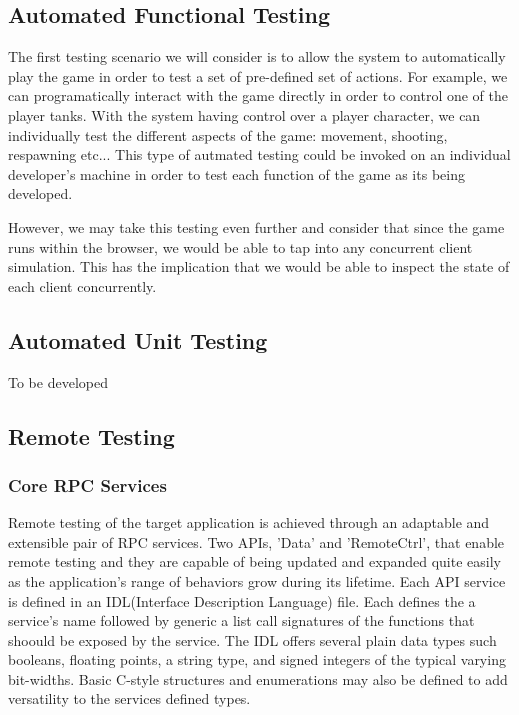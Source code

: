 \documentclass[conference]{IEEEtran}
\begin{document}
\subsection{Automated Functional Testing}

The first testing scenario we will consider is to allow the system to automatically play the game in order to test a set of pre-defined set of actions.
For example, we can programatically interact with the game directly in order to control one of the player tanks. With the system having control over a player character, 
we can individually test the different aspects of the game: movement, shooting, respawning etc... This type of autmated testing could be invoked on an individual developer's 
machine in order to test each function of the game as its being developed. 

However, we may take this testing even further and consider that since the game runs within the browser, we would be able to tap into any concurrent client simulation. This 
has the implication that we would be able to inspect the state of each client concurrently. 

\subsection{Automated Unit Testing}

To be developed 


\subsection{Remote Testing}

\subsubsection{Core RPC Services}Remote testing of the target application is achieved through an adaptable and extensible pair of RPC services. Two APIs, 'Data' and 'RemoteCtrl', that enable remote testing and they are capable of being updated and expanded quite easily as the application's range of behaviors grow during its lifetime. Each API service is defined in an IDL(Interface Description Language) file. Each defines the a service's name followed by generic a list call signatures of the functions that shoould be exposed by the service. The IDL offers several plain data types such booleans, floating points, a string type, and signed integers of the typical varying bit-widths. Basic C-style structures and enumerations may also be defined to add versatility to the services defined types.
\end{document}
